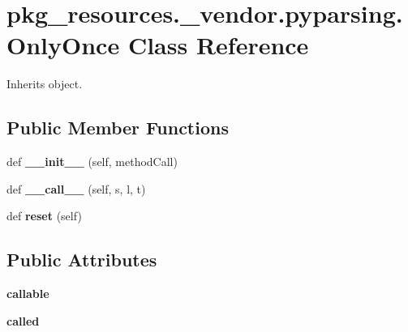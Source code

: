 \hypertarget{classpkg__resources_1_1__vendor_1_1pyparsing_1_1_only_once}{}\section{pkg\+\_\+resources.\+\_\+vendor.\+pyparsing.\+Only\+Once Class Reference}
\label{classpkg__resources_1_1__vendor_1_1pyparsing_1_1_only_once}


Inherits object.

\subsection*{Public Member Functions}
\begin{DoxyCompactItemize}
\item 
\mbox{\label{classpkg__resources_1_1__vendor_1_1pyparsing_1_1_only_once_a0a2ae7702105ceddb01bc1d2a93336b8}} 
def {\bfseries \+\_\+\+\_\+init\+\_\+\+\_\+} (self, method\+Call)
\item 
\mbox{\label{classpkg__resources_1_1__vendor_1_1pyparsing_1_1_only_once_a1352afa79608d4022813b2d9aa6d1131}} 
def {\bfseries \+\_\+\+\_\+call\+\_\+\+\_\+} (self, s, l, t)
\item 
\mbox{\label{classpkg__resources_1_1__vendor_1_1pyparsing_1_1_only_once_a925ee2e194f1e319c743b8655bd8bf47}} 
def {\bfseries reset} (self)
\end{DoxyCompactItemize}
\subsection*{Public Attributes}
\begin{DoxyCompactItemize}
\item 
\mbox{\label{classpkg__resources_1_1__vendor_1_1pyparsing_1_1_only_once_a3a381a4be1971de3ef2f12a762332d28}} 
{\bfseries callable}
\item 
\mbox{\label{classpkg__resources_1_1__vendor_1_1pyparsing_1_1_only_once_a0fbd7a1c2f5fb1c49e1a544f1389ee08}} 
{\bfseries called}
\end{DoxyCompactItemize}


